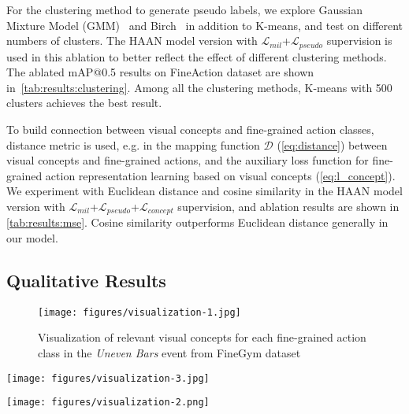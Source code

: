For the clustering method to generate pseudo labels, we explore Gaussian Mixture Model (GMM)~\cite{reynolds2009gaussian} and Birch~\cite{zhang1996birch} in addition to K-means, and test on different numbers of clusters. 
The HAAN model version with $\mathcal{L}_{mil}$+$\mathcal{L}_{pseudo}$ supervision is used in this ablation to better reflect the effect of different clustering methods. The ablated mAP@0.5 results on FineAction dataset are shown in~\cref{tab:results:clustering}. Among all the clustering methods, K-means with 500 clusters achieves the best result.




To build connection between visual concepts and fine-grained action classes, distance metric is used, e.g. in the mapping function $\mathcal{D}$ (\cref{eq:distance}) between visual concepts and fine-grained actions, and the auxiliary loss function for fine-grained action representation learning based on visual concepts (\cref{eq:l_concept}). We experiment with Euclidean distance and cosine similarity in the HAAN model version with $\mathcal{L}_{mil}$+$\mathcal{L}_{pseudo}$+$\mathcal{L}_{concept}$ supervision, and ablation results are shown in \cref{tab:results:mse}. Cosine similarity outperforms Euclidean distance generally in our model.






\subsection{Qualitative Results}




\begin{figure}[t]
  \centering
   \texttt{[image: figures/visualization-1.jpg]}
   \caption{Visualization of relevant visual concepts for each fine-grained action class in the \textit{Uneven Bars} event from FineGym dataset}
   \label{fig:concepts-actions}
\end{figure}

\begin{figure*}[t]
  \centering
   \texttt{[image: figures/visualization-3.jpg]}
   \caption{Three example visual concepts learned in our model representing atomic actions}
   \label{fig:concepts-example}
\end{figure*}


\begin{figure*}[t]
  \centering
   \texttt{[image: figures/visualization-2.png]}
   \caption{Two example action detections from our HAAN model. Visual concepts A and B correspond to those visualized in \cref{fig:concepts-example}}
   \label{fig:detection}
\end{figure*}


